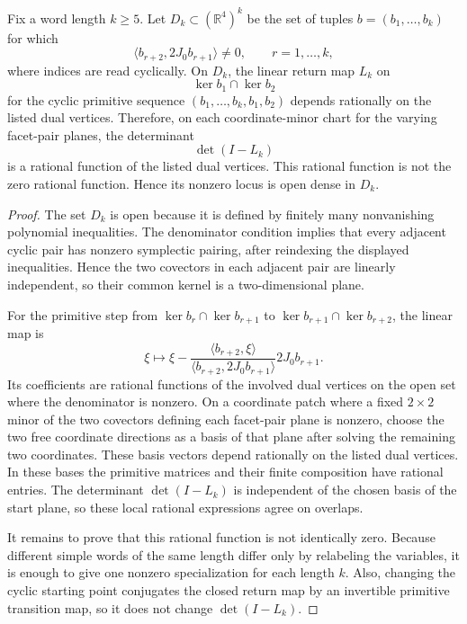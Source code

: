 \begin{unverified}
\begin{lemma}%
\label{lem:fg-long-word-determinants-open-dense}
Fix a word length \(k\ge5\).  Let \(D_k\subset(\mathbb R^4)^k\) be the set of
tuples \(b=(b_1,\ldots,b_k)\) for which
\[
  \langle b_{r+2},2J_0b_{r+1}\rangle\ne0,
  \qquad r=1,\ldots,k,
\]
where indices are read cyclically.  On \(D_k\), the linear return map \(L_k\)
on
\[
  \ker b_1\cap\ker b_2
\]
for the cyclic primitive sequence \((b_1,\ldots,b_k,b_1,b_2)\) depends
rationally on the listed dual vertices.  Therefore, on each
coordinate-minor chart for the varying facet-pair planes, the determinant
\[
  \det(I-L_k)
\]
is a rational function of the listed dual vertices.  This rational function is
not the zero rational function.  Hence its nonzero locus is open dense in
\(D_k\).
\end{lemma}

\begin{proof}
The set \(D_k\) is open because it is defined by finitely many nonvanishing
polynomial inequalities.  The denominator condition implies that every
adjacent cyclic pair has nonzero symplectic pairing, after reindexing the
displayed inequalities.  Hence the two covectors in each adjacent pair are
linearly independent, so their common kernel is a two-dimensional plane.

For the primitive step from
\(\ker b_r\cap\ker b_{r+1}\) to
\(\ker b_{r+1}\cap\ker b_{r+2}\), the linear map is
\[
  \xi\mapsto
  \xi
  -
  \frac{\langle b_{r+2},\xi\rangle}
       {\langle b_{r+2},2J_0b_{r+1}\rangle}
  2J_0b_{r+1} .
\]
Its coefficients are rational functions of the involved dual vertices on the
open set where the denominator is nonzero.  On a coordinate patch where a
fixed \(2\times2\) minor of the two covectors defining each facet-pair plane
is nonzero, choose the two free coordinate directions as a basis of that plane
after solving the remaining two coordinates.  These basis vectors depend
rationally on the listed dual vertices.  In these bases the primitive matrices
and their finite composition have rational entries.  The determinant
\(\det(I-L_k)\) is independent of the chosen basis of the start plane, so
these local rational expressions agree on overlaps.

It remains to prove that this rational function is not identically zero.
Because different simple words of the same length differ only by relabeling
the variables, it is enough to give one nonzero specialization for each
length \(k\).  Also, changing the cyclic starting point conjugates the closed
return map by an invertible primitive transition map, so it does not change
\(\det(I-L_k)\).


\end{proof}
\end{unverified}
